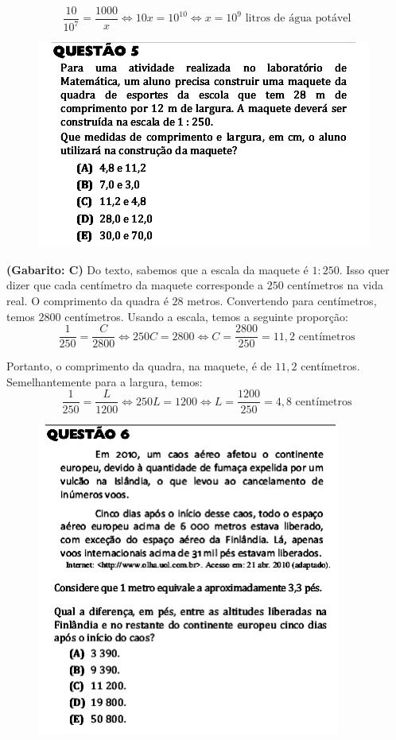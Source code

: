 \documentclass[a4paper]{article}
\begin{document}
\begin{equation*}
\frac{10}{10^7} = \frac{1000}{x} \iff 10x = 10^{10} \iff x = 10^9\text{ litros de água potável}
\end{equation*}
\begin{figure}[H]
	\begin{center}
		\includegraphics[width=11cm]{L2Q5.png}
	\end{center}
\end{figure}
\par\textbf{(Gabarito: C)} Do texto, sabemos que a escala da maquete é $1: 250$. Isso quer dizer que cada centímetro da maquete corresponde a $250$ centímetros na vida real. O comprimento da quadra é $28$ metros. Convertendo para centímetros, temos $2800$ centímetros. Usando a escala, temos a seguinte proporção:
\begin{equation*}
\frac{1}{250} = \frac{C}{2800} \iff 250C = 2800 \iff C = \frac{2800}{250} = 11,2\text{ centímetros}
\end{equation*}
\par\vspace{0.3cm} Portanto, o comprimento da quadra, na maquete, é de $11,2$ centímetros. Semelhantemente para a largura, temos:
\begin{equation*}
\frac{1}{250} = \frac{L}{1200} \iff 250L = 1200 \iff L = \frac{1200}{250} = 4,8\text{ centímetros}
\end{equation*}
\begin{figure}[H]
	\begin{center}
		\includegraphics[width=10cm]{L2Q6.png}
	\end{center}
\end{figure}
\end{document}
